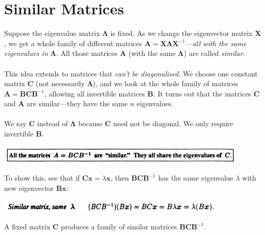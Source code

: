 \documentclass{report}
\begin{document}
\section{Similar Matrices}
Suppose the eigenvalue matrix $\bm\Lambda$ is fixed. As we change the eigenvector matrix $\bm X$, we get a whole family of different matrices 
$\bm A=\bm{X\Lambda X}^{-1}$---\textit{all with the same eigenvalues in} $\bm\Lambda$. All those matrices $\bm A$ (with the same 
$\bm\Lambda$) are called \textit{similar}.\\
\vspace{1mm}\\
This idea extends to matrices that \textit{can't be diagonalised}.
We choose one constant matrix $\bm C$ (not necessarily $\bm\Lambda$), and we look at the whole family of matrices 
$\bm A=\bm{BCB}^{-1}$, allowing all invertible matrices $\bm B$. It turns out that the matrices $\bm C$ and $\bm A$ are 
similar---they have the same $n$ eigenvalues.\\
\vspace{1mm}\\
We say $\bm C$ instead of $\bm\Lambda$ because $\bm C$ need not be diagonal. We only require invertible $\bm B$.
\begin{center}
\includegraphics[width=12cm]{131}
\end{center}
To show this, see that if $\bm{Cx}=\lambda\bm x$, then $\bm{BCB}^{-1}$ has the same eigenvalue $\lambda$ with new eigenvector $\bm{Bx}$:
\begin{center}
\includegraphics[width=11cm]{132}
\end{center}
A fixed matrix $\bm C$ produces a family of similar matrices $\bm{BCB}^{-1}$.
\newpage
\end{document}
